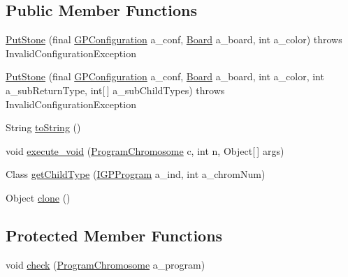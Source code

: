\subsection*{Public Member Functions}
\begin{DoxyCompactItemize}
\item 
\hyperlink{classexamples_1_1gp_1_1tictactoe_1_1_put_stone_ae2532af081b299a5b4a9436f3af079ad}{Put\-Stone} (final \hyperlink{classorg_1_1jgap_1_1gp_1_1impl_1_1_g_p_configuration}{G\-P\-Configuration} a\-\_\-conf, \hyperlink{classexamples_1_1gp_1_1tictactoe_1_1_board}{Board} a\-\_\-board, int a\-\_\-color)  throws Invalid\-Configuration\-Exception 
\item 
\hyperlink{classexamples_1_1gp_1_1tictactoe_1_1_put_stone_a16a5c08527dc014b9088790b81abcf7f}{Put\-Stone} (final \hyperlink{classorg_1_1jgap_1_1gp_1_1impl_1_1_g_p_configuration}{G\-P\-Configuration} a\-\_\-conf, \hyperlink{classexamples_1_1gp_1_1tictactoe_1_1_board}{Board} a\-\_\-board, int a\-\_\-color, int a\-\_\-sub\-Return\-Type, int\mbox{[}$\,$\mbox{]} a\-\_\-sub\-Child\-Types)  throws Invalid\-Configuration\-Exception 
\item 
String \hyperlink{classexamples_1_1gp_1_1tictactoe_1_1_put_stone_a1de4e25482a23d050b47513afc63f192}{to\-String} ()
\item 
void \hyperlink{classexamples_1_1gp_1_1tictactoe_1_1_put_stone_acd511eb418086c47b424b588c53808af}{execute\-\_\-void} (\hyperlink{classorg_1_1jgap_1_1gp_1_1impl_1_1_program_chromosome}{Program\-Chromosome} c, int n, Object\mbox{[}$\,$\mbox{]} args)
\item 
Class \hyperlink{classexamples_1_1gp_1_1tictactoe_1_1_put_stone_a23a3d6c53b8cf1e96a7ab9fa98a9faf0}{get\-Child\-Type} (\hyperlink{interfaceorg_1_1jgap_1_1gp_1_1_i_g_p_program}{I\-G\-P\-Program} a\-\_\-ind, int a\-\_\-chrom\-Num)
\item 
Object \hyperlink{classexamples_1_1gp_1_1tictactoe_1_1_put_stone_a8c04eefa4b496702acc95d98efdedf71}{clone} ()
\end{DoxyCompactItemize}
\subsection*{Protected Member Functions}
\begin{DoxyCompactItemize}
\item 
void \hyperlink{classexamples_1_1gp_1_1tictactoe_1_1_put_stone_a1f7aa0adc9990661906110c9469c12fe}{check} (\hyperlink{classorg_1_1jgap_1_1gp_1_1impl_1_1_program_chromosome}{Program\-Chromosome} a\-\_\-program)
\end{DoxyCompactItemize}
